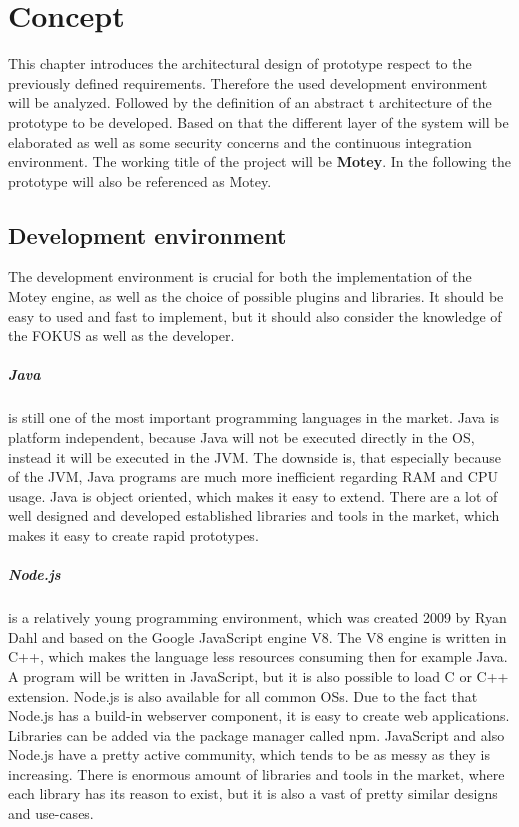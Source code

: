 \chapter{Concept}
\label{chapter:concept}
\minitoc\vspace{.5cm}
This chapter introduces the architectural design of prototype respect to the previously defined requirements.
Therefore the used development environment will be analyzed.
Followed by the definition of an abstract t architecture of the prototype to be developed.
Based on that the different layer of the system will be elaborated as well as some security concerns and the continuous integration environment.
The working title of the project will be \textbf{Motey}.
In the following the prototype will also be referenced as Motey.


\section{Development environment}
The development environment is crucial for both the implementation of the Motey engine, as well as the choice of possible plugins and libraries.
It should be easy to used and fast to implement, but it should also consider the knowledge of the \ac{FOKUS} as well as the developer.

\paragraph{Java} is still one of the most important programming languages in the market.\autocite[cf.]{ProgramminLanguage:2017}
Java is platform independent, because Java will not be executed directly in the \ac{OS}, instead it will be executed in the \ac{JVM}.
The downside is, that especially because of the \ac{JVM}, Java programs are much more inefficient regarding \ac{RAM} and \ac{CPU} usage.
Java is object oriented, which makes it easy to extend.
There are a lot of well designed and developed established libraries and tools in the market, which makes it easy to create rapid prototypes.

\paragraph{Node.js} is a relatively young programming environment, which was created 2009 by Ryan Dahl and based on the Google JavaScript engine V8.
The V8 engine is written in C++, which makes the language less resources consuming then for example Java.
A program will be written in JavaScript, but it is also possible to load C or C++ extension.
Node.js is also available for all common \acp{OS}.
Due to the fact that Node.js has a build-in webserver component, it is easy to create web applications.
Libraries can be added via the package manager called npm.
JavaScript and also Node.js have a pretty active community, which tends to be as messy as they is increasing.
There is enormous amount of libraries and tools in the market, where each library has its reason to exist, but it is also a vast of pretty similar designs and use-cases.

